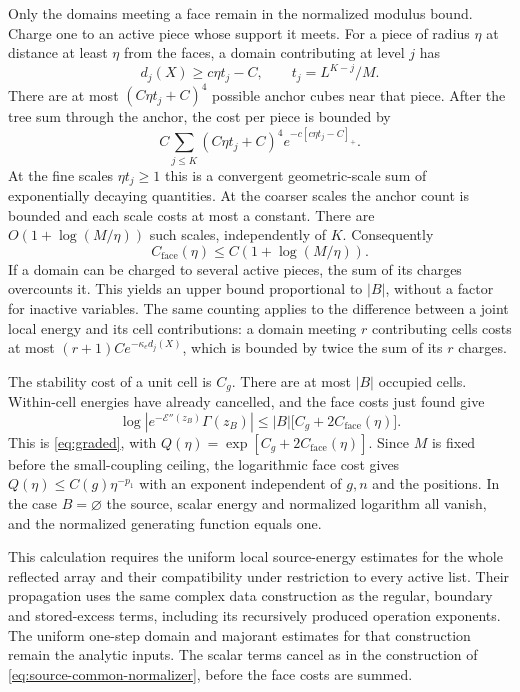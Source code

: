 \documentclass[11pt,letterpaper,reqno]{amsart}
\theoremstyle{definition}
\theoremstyle{remark}
\begin{document}
Only the domains meeting a face remain in the normalized modulus
bound. Charge one to an active piece whose support it meets.
For a piece of radius $\eta$ at distance at least $\eta$ from
the faces, a domain contributing at level $j$ has
\[
 d_j(X)\ge c\eta t_j-C,
 \qquad t_j=L^{K-j}/M.
\]
There are at most $(C\eta t_j+C)^4$ possible anchor cubes near
that piece. After the tree sum through the anchor, the cost per
piece is bounded by
\[
 C\sum_{j\le K}(C\eta t_j+C)^4
                            e^{-c[c\eta t_j-C]_+}.
\]
At the fine scales $\eta t_j\ge1$ this is a convergent
geometric-scale sum of exponentially decaying quantities. At the
coarser scales the anchor count is bounded and each scale costs at
most a constant. There are
$O(1+\log(M/\eta))$ such scales, independently of $K$.
Consequently
\[
 C_{\mathrm{face}}(\eta)
                   \le C(1+\log(M/\eta)).
\]
If a domain can be charged to several active pieces, the sum of its
charges overcounts it. This yields an upper bound proportional to
$|B|$, without a factor for inactive variables. The same counting
applies to the difference between a joint local energy and its
cell contributions: a domain meeting $r$ contributing cells costs
at most $(r+1)Ce^{-\kappa_ed_j(X)}$, which is bounded by twice
the sum of its $r$ charges.

The stability cost of a unit cell is $C_g$. There are at most
$|B|$ occupied cells. Within-cell energies have already cancelled,
and the face costs just found give
\[
 \log|e^{-\mathcal E''(z_B)}\Gamma(z_B)|
      \le |B|\bigl[C_g+2C_{\mathrm{face}}(\eta)\bigr].
\]
This is \eqref{eq:graded}, with
$Q(\eta)=\exp[C_g+2C_{\mathrm{face}}(\eta)]$.
Since $M$ is fixed before the small-coupling ceiling, the logarithmic
face cost gives $Q(\eta)\le C(g)\eta^{-p_1}$ with an exponent
independent of $g,n$ and the positions. In the case $B=\varnothing$
the source, scalar energy and normalized logarithm all vanish, and
the normalized generating function equals one.

This calculation requires the uniform local source-energy estimates
for the whole reflected array and their compatibility under restriction
to every active list. Their propagation uses the same complex data construction as the
regular, boundary and stored-excess terms, including its recursively
produced operation exponents. The uniform one-step domain and
majorant estimates for that construction remain the analytic inputs. The scalar terms cancel as in the construction of
\eqref{eq:source-common-normalizer}, before the face costs are summed.
\end{document}
